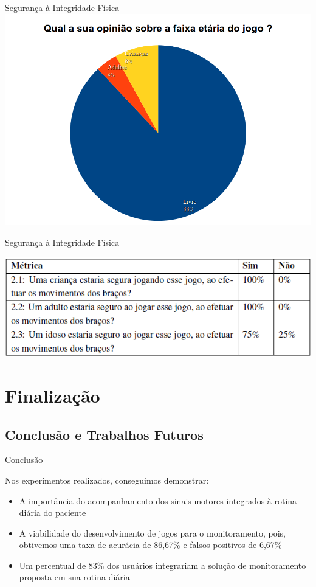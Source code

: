 \documentclass{beamer}
\begin{document}
\begin{frame}{Segurança à Integridade Física} 
			\center \includegraphics[height=2.8 in]{img/chartfaixaetaria.png}
\end{frame}

\begin{frame}{Segurança à Integridade Física} 
    \begin{block}{}
			\center \includegraphics[height=1.4 in]{img/metricasq2.png}
    \end{block}
\end{frame}


\section{Finalização}
\subsection{Conclusão e Trabalhos Futuros}

\begin{frame}{Conclusão}
\begin{block}{}
Nos experimentos realizados, conseguimos demonstrar:
  \begin{itemize}
   \item A importância do acompanhamento dos sinais motores integrados à rotina diária do paciente
   \item A viabilidade do desenvolvimento de jogos para o monitoramento, pois, obtivemos uma taxa de acurácia de 86,67\% e falsos positivos de 6,67\%
   \item Um percentual de 83\% dos usuários integrariam a solução de monitoramento proposta em sua rotina diária
  \end{itemize}
\end{block}
\end{frame}
\end{document}
